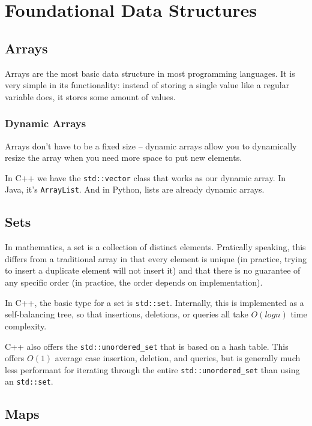 \section{Foundational Data Structures}
\subsection{Arrays}

Arrays are the most basic data structure in most programming languages. It is very simple in its functionality: instead of storing a single value like a regular variable does, it stores some amount of values.

\subsubsection{Dynamic Arrays}

Arrays don't have to be a fixed size -- dynamic arrays allow you to dynamically resize the array when you need more space to put new elements.

In C++ we have the \texttt{std::vector} class that works as our dynamic array. In Java, it's \texttt{ArrayList}. And in Python, lists are already dynamic arrays.

\subsection{Sets}

In mathematics, a set is a collection of distinct elements. Pratically speaking, this differs from a traditional array in that every element is unique (in practice, trying to insert a duplicate element will not insert it) and that there is no guarantee of any specific order (in practice, the order depends on implementation).

In C++, the basic type for a set is \texttt{std::set}. Internally, this is implemented as a self-balancing tree, so that insertions, deletions, or queries all take $O(log n)$ time complexity.

C++ also offers the \texttt{std::unordered_set} that is based on a hash table. This offers $O(1)$ average case insertion, deletion, and queries, but is generally much less performant for iterating through the entire \texttt{std::unordered_set} than using an \texttt{std::set}.

\subsection{Maps}

